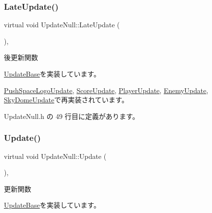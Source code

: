 \subsubsection{\texorpdfstring{Late\+Update()}{LateUpdate()}}
{\footnotesize\ttfamily virtual void Update\+Null\+::\+Late\+Update (\begin{DoxyParamCaption}{ }\end{DoxyParamCaption})\hspace{0.3cm}{\ttfamily [inline]}, {\ttfamily [virtual]}}



後更新関数 



\mbox{\hyperlink{class_update_base_afc4956f78135aed5fc4e4f9991be50b9}{Update\+Base}}を実装しています。



\mbox{\hyperlink{class_push_space_logo_update_a4423864fb22b1211e92a4317d0b70a44}{Push\+Space\+Logo\+Update}}, \mbox{\hyperlink{class_score_update_adc9a48f54828e49c072c298777935893}{Score\+Update}}, \mbox{\hyperlink{class_player_update_ae376f517f3458edfef61ac366aa78e36}{Player\+Update}}, \mbox{\hyperlink{class_enemy_update_ae14e4ebb42ad9043534e53edcba5b242}{Enemy\+Update}}, \mbox{\hyperlink{class_sky_dome_update_a94347cb50b4dc13528738a7b812da261}{Sky\+Dome\+Update}}で再実装されています。



 Update\+Null.\+h の 49 行目に定義があります。

\mbox{\label{class_update_null_a692f4f34e4ef35ca286a1d3606fdf473}} 
\subsubsection{\texorpdfstring{Update()}{Update()}}
{\footnotesize\ttfamily virtual void Update\+Null\+::\+Update (\begin{DoxyParamCaption}{ }\end{DoxyParamCaption})\hspace{0.3cm}{\ttfamily [inline]}, {\ttfamily [virtual]}}



更新関数 



\mbox{\hyperlink{class_update_base_a9fdc8924001cf6fa89c1f5fa0d867682}{Update\+Base}}を実装しています。



